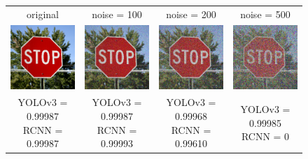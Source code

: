 \documentclass{article}
\begin{document}
\begin{figure}[h]
\centering
\begin{tabular}{ c c c c }
    original & noise = 100 & noise = 200 & noise = 500 \\
    \includegraphics[width=0.2\linewidth]{../test_images/stop.png} & \includegraphics[width=0.2\linewidth]{../test_images/perturbed/stop_noise_100.png} & \includegraphics[width=0.2\linewidth]{../test_images/perturbed/stop_noise_200.png} & \includegraphics[width=0.2\linewidth]{../test_images/perturbed/stop_noise_500.png} \\
    \makecell{YOLOv3 = 0.99987 \\ RCNN = 0.99987} & \makecell{YOLOv3 = 0.99987 \\ RCNN = 0.99993} & \makecell{YOLOv3 = 0.99968 \\ RCNN = 0.99610} & \makecell{YOLOv3 = 0.99985 \\ RCNN = 0} \\[1cm]

\end{tabular}
\end{figure}
\end{document}
